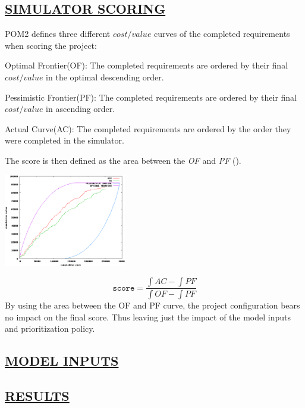 \begin{kasten}
    \section*{ \hspace{0.1cm} {\color{red} \underline{SIMULATOR SCORING}}}
    \large{
      POM2 defines three different $cost/value$ curves of the completed requirements when scoring the project:
      \begin{smallenum}
      \item Optimal Frontier(OF): The completed requirements are ordered by their final $cost/value$ in the optimal descending order.
      \item Pessimistic Frontier(PF): The completed requirements are ordered by their final $cost/value$ in ascending order.
      \item Actual Curve(AC): The completed requirements are ordered by the order they were completed in the simulator.
      \end{smallenum}

      The score is then defined as the area between the \textit{OF} and \textit{PF} ().
      
      \begin{minipage}{5.35cm}
        \includegraphics[width=5.35cm]{fakechart.eps}
      \end{minipage}
      \begin{minipage}{7.65cm}
        \begin{equation}\label{eq:score}
          \mathtt{score} = \frac{\int AC - \int PF}{\int OF - \int PF}
        \end{equation}
        By using the area between the OF and PF curve, the project configuration bears no impact on the final score. Thus leaving just the impact of the model inputs and prioritization policy.
      \end{minipage}
    }
\end{kasten}

\begin{kasten}
    \section*{ \hspace{0.1cm} {\color{red} \underline{MODEL INPUTS}}}
    \large{
    
    }
\end{kasten}

\begin{kasten}
    \section*{ \hspace{0.1cm} {\color{red} \underline{RESULTS}}}
    \tiny
    
    \vspace{-.5em}
\end{kasten}
